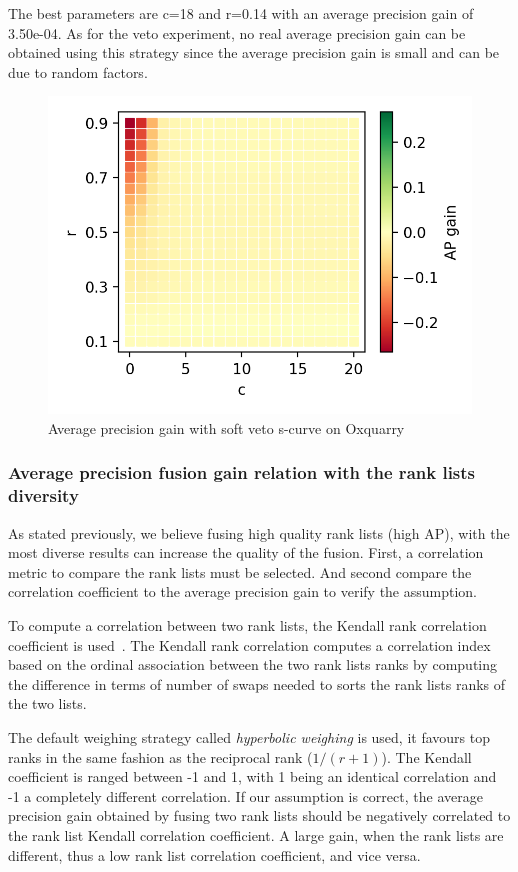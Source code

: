 The best parameters are c=18 and r=0.14 with an average precision gain of 3.50e-04.
As for the veto experiment, no real average precision gain can be obtained using this strategy since the average precision gain is small and can be due to random factors.

\begin{figure}
  \caption{Average precision gain with soft veto s-curve on Oxquarry}
  \label{fig:soft_veto}
  \includegraphics[width=\linewidth]{img/soft_veto.png}
\end{figure}

\subsubsection{Average precision fusion gain relation with the rank lists diversity}

As stated previously, we believe fusing high quality rank lists (high AP), with the most diverse results can increase the quality of the fusion.
First, a correlation metric to compare the rank lists must be selected.
And second compare the correlation coefficient to the average precision gain to verify the assumption.

To compute a correlation between two rank lists, the Kendall rank correlation coefficient is used~\cite{scipy}.
The Kendall rank correlation computes a correlation index based on the ordinal association between the two rank lists ranks by computing the difference in terms of number of swaps needed to sorts the rank lists ranks of the two lists.

The default weighing strategy called \textit{hyperbolic weighing} is used, it favours top ranks in the same fashion as the reciprocal rank ($1 / (r + 1)$).
The Kendall coefficient is ranged between -1 and 1, with 1 being an identical correlation and -1 a completely different correlation.
If our assumption is correct, the average precision gain obtained by fusing two rank lists should be negatively correlated to the rank list Kendall correlation coefficient.
A large gain, when the rank lists are different, thus a low rank list correlation coefficient, and vice versa.

